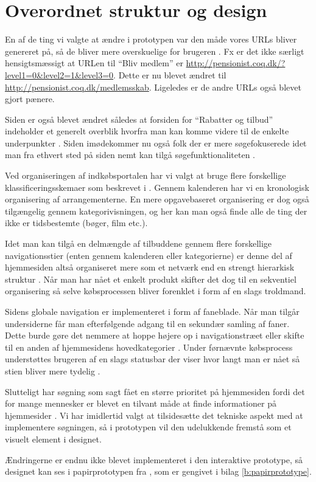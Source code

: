 \chapter{Overordnet struktur og design}

En af de ting vi valgte at ændre i prototypen var den
måde vores URLs bliver genereret på, så de bliver mere
overskuelige for brugeren \cite[s.~385]{Benyon2010}. Fx er det
ikke særligt hensigtsmæssigt at URLen til ``Bliv medlem'' er
\url{http://pensionist.coq.dk/?level1=0&level2=1&level3=0}. Dette er nu blevet
ændret til \url{http://pensionist.coq.dk/medlemsskab}. Ligeledes er de andre
URLs også blevet gjort pænere.

Siden er også blevet ændret således at forsiden for ``Rabatter og tilbud''
indeholder et generelt overblik hvorfra man kan komme videre til de enkelte
underpunkter \cite[s.~386]{Benyon2010}. Siden imødekommer nu også folk der
er mere søgefokuserede idet man fra ethvert sted på siden nemt kan tilgå
søgefunktionaliteten \cite[s. 386]{Benyon2010}.

Ved organiseringen af indkøbsportalen har vi valgt at bruge flere forskellige
klassificeringsskemaer som beskrevet i \cite[s.~392--394]{Benyon2010}.
Gennem kalenderen har vi en kronologisk organisering af arrangementerne.
En mere opgavebaseret organisering er dog også tilgængelig gennem
kategorivisningen, og her kan man også finde alle de ting der ikke er
tidsbestemte (bøger, film etc.).

Idet man kan tilgå en delmængde af tilbuddene gennem flere forskellige
navigationsstier (enten gennem kalenderen eller kategorierne) er denne del af
hjemmesiden altså organiseret mere som et netværk end en strengt hierarkisk
struktur \cite[s.~396]{Benyon2010}. Når man har nået et enkelt produkt
skifter det dog til en sekventiel organisering så selve købsprocessen bliver
forenklet i form af en slags troldmand.

Sidens globale navigation er implementeret i form af faneblade. Når
man tilgår undersiderne får man efterfølgende adgang til en sekundær
samling af faner. Dette burde gøre det nemmere at hoppe højere op i
navigationstræet eller skifte til en anden af hjemmesidens hovedkategorier
\cite[s.~402]{Benyon2010}. Under førnævnte købsprocess understøttes
brugeren af en slags statusbar der viser hvor langt man er nået så stien
bliver mere tydelig \cite[s.~403]{Benyon2010}.

Slutteligt har søgning som sagt fået en større prioritet på hjemmesiden
fordi det for mange mennesker er blevet en tilvant måde at finde
informationer på hjemmesider \cite[s.~405]{Benyon2010}. Vi har imidlertid
valgt at tilsidesætte det tekniske aspekt med at implementere søgningen, så
i prototypen vil den udelukkende fremstå som et visuelt element i designet.

Ændringerne er endnu ikke blevet implementeret i den interaktive prototype,
så designet kan ses i papirprototypen fra \cite{osos}, som er gengivet i
bilag \ref{b:papirprototype}.
